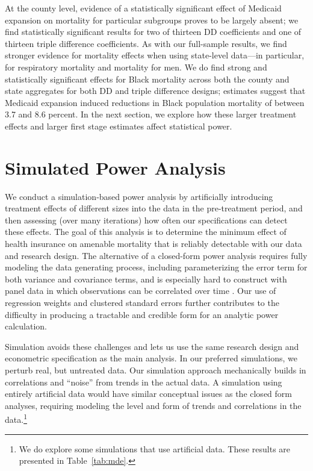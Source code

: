 \documentclass[12pt]{article}%
\begin{document}
At the county level, evidence of a statistically significant effect of Medicaid expansion on mortality for particular subgroups proves to be largely absent; we find statistically significant results for two of thirteen DD coefficients and one of thirteen triple difference coefficients. 
As with our full-sample results, we find stronger evidence for mortality effects when using state-level data---in particular, for respiratory mortality and mortality for men. 
We do find strong and statistically significant effects for Black mortality across both the county and state aggregates for both DD and triple difference designs; estimates suggest that Medicaid expansion induced reductions in Black population mortality of between 3.7 and 8.6 percent. 
In the next section, we explore how these larger treatment effects and larger first stage estimates affect statistical power. 

\section{Simulated Power Analysis}\label{sec:simulated_power_analysis}

We conduct a simulation-based power analysis by artificially introducing treatment effects of different sizes into the data in the pre-treatment period, and then assessing (over many iterations) how often our specifications can detect these effects.  
The goal of this analysis is to determine the minimum effect of health insurance on amenable mortality that is reliably detectable with our data and research design.  
The alternative of a closed-form power analysis requires fully modeling the data generating process, including parameterizing the error term for both variance and covariance terms, and is especially hard to construct with panel data in which observations can be correlated over time \citep{Burlig2019}.  
Our use of regression weights and clustered standard errors further contributes to the difficulty in producing a tractable and credible form for an analytic power calculation.  

Simulation avoids these challenges and lets us use the same research design and econometric specification as the main analysis. 
In our preferred simulations, we perturb real, but untreated data.
Our simulation approach mechanically builds in correlations and ``noise'' from trends in the actual data. 
A simulation using entirely artificial data would have similar conceptual issues as the closed form analyses, requiring modeling the level and form of trends and correlations in the data.\footnote{We do explore some simulations that use artificial data. These results are presented in Table~\ref{tab:mde}.}
\end{document}
